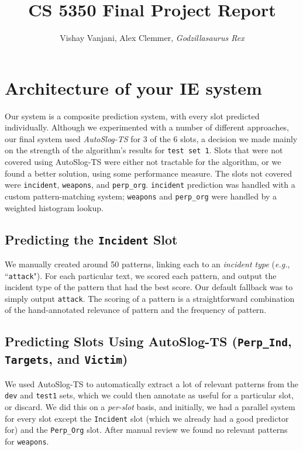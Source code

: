 \documentclass[11pt]{myclass}
\title{CS 5350 Final Project Report}
\author{Vishay Vanjani, Alex Clemmer, \textit{Godzillasaurus Rex}}
\begin{document}
\maketitle

\section{Architecture of your IE system}

Our system is a composite prediction system, with every slot predicted individually. Although we experimented with a number of different approaches, our final system used \textit{AutoSlog-TS} for 3 of the 6 slots, a decision we made mainly on the strength of the algorithm's results for \texttt{test set 1}. Slots that were not covered using AutoSlog-TS were either not tractable for the algorithm, or we found a better solution, using some performance measure. The slots not covered were \texttt{incident}, \texttt{weapons}, and \texttt{perp\_org}. \texttt{incident} prediction was handled with a custom pattern-matching system; \texttt{weapons} and \texttt{perp\_org} were handled by a weighted histogram lookup.

\subsection{Predicting the \texttt{Incident} Slot}

We manually created around 50 patterns, linking each to an \textit{incident type} (\textit{e.g.}, ``\texttt{attack}"). For each particular text, we scored each pattern, and output the incident type of the pattern that had the best score. Our default fallback was to simply output \texttt{attack}. The scoring of a pattern is a straightforward combination of the hand-annotated relevance of pattern and the frequency of pattern.

\subsection{Predicting Slots Using AutoSlog-TS (\texttt{Perp\_Ind}, \texttt{Targets}, and \texttt{Victim})}

We used AutoSlog-TS to automatically extract a lot of relevant patterns from the \texttt{dev} and \texttt{test1} sets, which we could then annotate as useful for a particular slot, or discard. We did this on a \textit{per-slot} basis, and initially, we had a parallel system for every slot except the \texttt{Incident} slot (which we already had a good predictor for) and the \texttt{Perp\_Org} slot. After manual review we found no relevant patterns for \texttt{weapons}.
\end{document}

